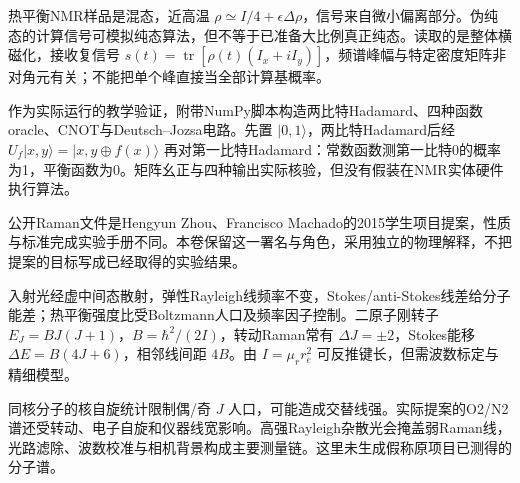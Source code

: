 热平衡NMR样品是混态，近高温 $\rho\simeq I/4+\epsilon\Delta\rho$，信号来自微小偏离部分。伪纯态的计算信号可模拟纯态算法，但不等于已准备大比例真正纯态。读取的是整体横磁化，接收复信号 $s(t)=\operatorname{tr}[\rho(t)(I_x+iI_y)]$，频谱峰幅与特定密度矩阵非对角元有关；不能把单个峰直接当全部计算基概率。

作为实际运行的教学验证，附带NumPy脚本构造两比特Hadamard、四种函数oracle、CNOT与Deutsch--Jozsa电路。先置 $|0,1\rangle$，两比特Hadamard后经 $U_f|x,y\rangle=|x,y\oplus f(x)\rangle$ 再对第一比特Hadamard：常数函数测第一比特0的概率为1，平衡函数为0。矩阵幺正与四种输出实际核验，但没有假装在NMR实体硬件执行算法。

公开Raman文件是Hengyun Zhou、Francisco Machado的2015学生项目提案，性质与标准完成实验手册不同。本卷保留这一署名与角色，采用独立的物理解释，不把提案的目标写成已经取得的实验结果。

入射光经虚中间态散射，弹性Rayleigh线频率不变，Stokes/anti-Stokes线差给分子能差；热平衡强度比受Boltzmann人口及频率因子控制。二原子刚转子 $E_J=BJ(J+1)$，$B=\hbar^2/(2I)$，转动Raman常有 $\Delta J=\pm2$，Stokes能移 $\Delta E=B(4J+6)$，相邻线间距 $4B$。由 $I=\mu_r r_e^2$ 可反推键长，但需波数标定与精细模型。

同核分子的核自旋统计限制偶/奇 $J$ 人口，可能造成交替线强。实际提案的O2/N2谱还受转动、电子自旋和仪器线宽影响。高强Rayleigh杂散光会掩盖弱Raman线，光路滤除、波数校准与相机背景构成主要测量链。这里未生成假称原项目已测得的分子谱。

